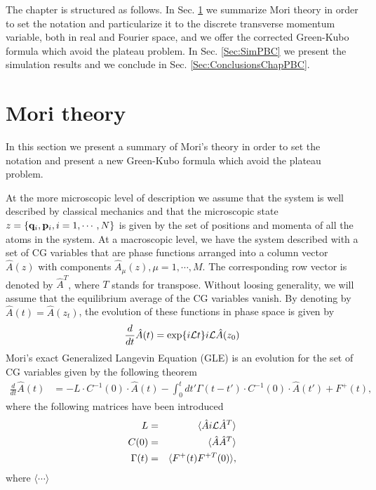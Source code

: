 \documentclass[a4paper,openright,12pt]{book}
\newcommand{\esc}{\!\cdot\!}
\begin{document}
The chapter is structured as follows. In Sec. \ref{Sec:Mori} we summarize
Mori theory in  order to set the notation and  particularize it to the
discrete transverse momentum variable, both in real and Fourier space, and we offer the corrected Green-Kubo formula which avoid the plateau problem.
In Sec. \ref{Sec:SimPBC} we present the simulation results and we conclude
in Sec. \ref{Sec:ConclusionsChapPBC}.


\section{Mori theory}
\label{Sec:Mori}
In this section we present a summary of Mori's theory in order to
set the notation and present a new Green-Kubo formula which avoid the plateau problem. 


At the more microscopic level of description we assume that the system is  well described  by classical  mechanics and  that the  microscopic state $z=\{{\bf q}_i,{\bf p}_i,i=1,\cdots,N\}$  is given by the set of positions  and momenta  of all  the atoms  in the  system.
At a macroscopic  level, we have  the system described with a  set of CG variables  that are phase functions arranged  into a column vector  $\hat{A}(z)$ with components $\hat{A}_\mu(z),\mu=1,\cdots,M$.   
The  corresponding  row  vector  is denoted  by  $\hat{A}^T$, where  $T$  stands  for transpose.   
Without loosing generality, we will assume that the equilibrium average of the CG variables  vanish.  
By  denoting by  $\hat{A}(t)=\hat{A}(z_t)$, the evolution of these functions in phase space is given by
\begin{eqnarray}
\frac{d}{dt}{\hat{A}}(t)=\exp\{i{\cal L}t\}i{\cal L}\hat{A}(z_0)
\label{LA}
\end{eqnarray}
Mori's  exact  Generalized Langevin  Equation  (GLE)  is an  evolution for the set of CG variables given by the following theorem
\begin{align}
\frac{d}{dt}\hat{A}(t) &= -L\esc C^{-1}(0)\esc \hat{A} (t)
-\int_0^tdt'\Gamma(t-t')\esc  C^{-1}(0)\esc \hat{A} (t') +F^+(t),
\label{exact}
\end{align}
where the following matrices have been introduced
\begin{eqnarray}
L&=&\langle \hat{A}i{\cal L}\hat{A}^T\rangle
\nonumber\\
C(0)&=&\langle \hat{A}\hat{A}^T\rangle
\nonumber\\
\Gamma(t)&=&\langle F^+(t)F^{+T}(0)\rangle,
\label{def}
\end{eqnarray}
where  $\langle\cdots \rangle$
\end{document}
